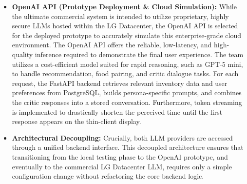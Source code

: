 \documentclass[conference]{IEEEtran}
\begin{document}
\begin{itemize}
    \item \textbf{OpenAI API (Prototype Deployment \& Cloud Simulation):} While the ultimate commercial system is intended to utilize proprietary, highly secure LLMs hosted within the LG Datacenter, the OpenAI API is selected for the deployed prototype to accurately simulate this enterprise-grade cloud environment. The OpenAI API offers the reliable, low-latency, and high-quality inference required to demonstrate the final user experience. The team utilizes a cost-efficient model suited for rapid reasoning, such as GPT-5 mini, to handle recommendation, food pairing, and critic dialogue tasks. For each request, the FastAPI backend retrieves relevant inventory data and user preferences from PostgreSQL, builds persona-specific prompts, and combines the critic responses into a stored conversation. Furthermore, token streaming is implemented to drastically shorten the perceived time until the first response appears on the thin-client display.
    \item \textbf{Architectural Decoupling:} Crucially, both LLM providers are accessed through a unified backend interface. This decoupled architecture ensures that transitioning from the local testing phase to the OpenAI prototype, and eventually to the commercial LG Datacenter LLM, requires only a simple configuration change without refactoring the core backend logic.
\end{itemize}
\end{document}
